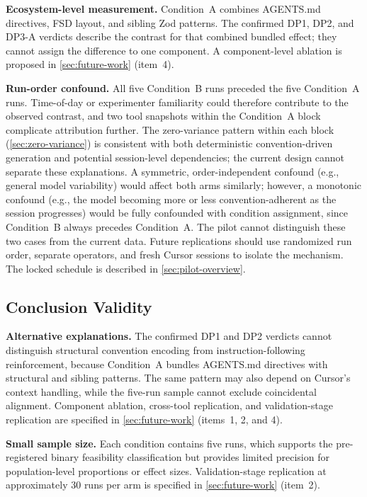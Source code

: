 \documentclass[12pt,a4paper]{report}
\begin{document}
\textbf{Ecosystem-level measurement.} Condition~A combines AGENTS.md directives, FSD layout, and sibling Zod patterns. The confirmed DP1, DP2, and DP3-A verdicts describe the contrast for that combined bundled effect; they cannot assign the difference to one component. A component-level ablation is proposed in \autoref{sec:future-work} (item~4).

\textbf{Run-order confound.} All five Condition~B runs preceded the five Condition~A runs. Time-of-day or experimenter familiarity could therefore contribute to the observed contrast, and two tool snapshots within the Condition~A block complicate attribution further. The zero-variance pattern within each block (\autoref{sec:zero-variance}) is consistent with both deterministic convention-driven generation and potential session-level dependencies; the current design cannot separate these explanations. A symmetric, order-independent confound (e.g., general model variability) would affect both arms similarly; however, a monotonic confound (e.g., the model becoming more or less convention-adherent as the session progresses) would be fully confounded with condition assignment, since Condition~B always precedes Condition~A. The pilot cannot distinguish these two cases from the current data. Future replications should use randomized run order, separate operators, and fresh Cursor sessions to isolate the mechanism. The locked schedule is described in \autoref{sec:pilot-overview}.

\subsection{Conclusion Validity}
\label{sec:conclusion-validity}

\textbf{Alternative explanations.} The confirmed DP1 and DP2 verdicts cannot distinguish structural convention encoding from instruction-following reinforcement, because Condition~A bundles AGENTS.md directives with structural and sibling patterns. The same pattern may also depend on Cursor's context handling, while the five-run sample cannot exclude coincidental alignment. Component ablation, cross-tool replication, and validation-stage replication are specified in \autoref{sec:future-work} (items~1, 2, and 4).

\textbf{Small sample size.} Each condition contains five runs, which supports the pre-registered binary feasibility classification but provides limited precision for population-level proportions or effect sizes. Validation-stage replication at approximately 30 runs per arm is specified in \autoref{sec:future-work} (item~2).
\end{document}
